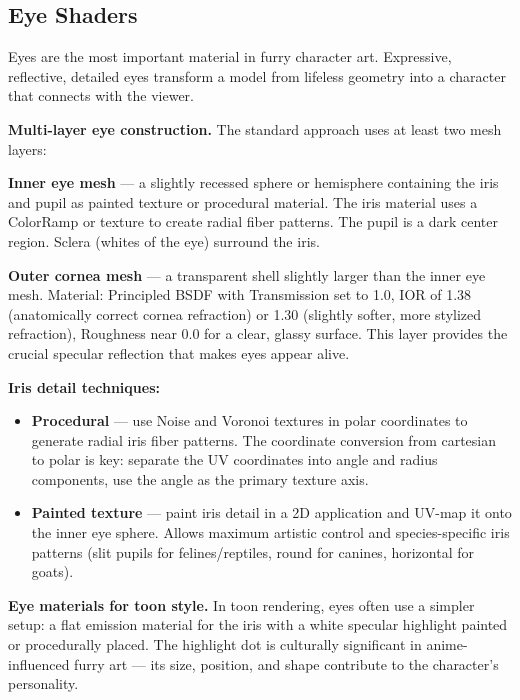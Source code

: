 \subsection{Eye Shaders}
\label{subsec:eye-shaders}

Eyes are the most important material in furry character art. Expressive, reflective, detailed eyes transform a model from lifeless geometry into a character that connects with the viewer.

\begin{furrybox}
\textbf{Multi-layer eye construction.} The standard approach uses at least two mesh layers:

\textbf{Inner eye mesh} --- a slightly recessed sphere or hemisphere containing the iris and pupil as painted texture or procedural material. The iris material uses a ColorRamp or texture to create radial fiber patterns. The pupil is a dark center region. Sclera (whites of the eye) surround the iris.

\textbf{Outer cornea mesh} --- a transparent shell slightly larger than the inner eye mesh. Material: Principled BSDF with Transmission set to 1.0, IOR of 1.38 (anatomically correct cornea refraction) or 1.30 (slightly softer, more stylized refraction), Roughness near 0.0 for a clear, glassy surface. This layer provides the crucial specular reflection that makes eyes appear alive.
\end{furrybox}

\textbf{Iris detail techniques:}

\begin{itemize}[leftmargin=2em]
  \item \textbf{Procedural} --- use Noise and Voronoi textures in polar coordinates to generate radial iris fiber patterns. The coordinate conversion from cartesian to polar is key: separate the UV coordinates into angle and radius components, use the angle as the primary texture axis.
  \item \textbf{Painted texture} --- paint iris detail in a 2D application and UV-map it onto the inner eye sphere. Allows maximum artistic control and species-specific iris patterns (slit pupils for felines/reptiles, round for canines, horizontal for goats).
\end{itemize}

\textbf{Eye materials for toon style.} In toon rendering, eyes often use a simpler setup: a flat emission material for the iris with a white specular highlight painted or procedurally placed. The highlight dot is culturally significant in anime-influenced furry art --- its size, position, and shape contribute to the character's personality.


